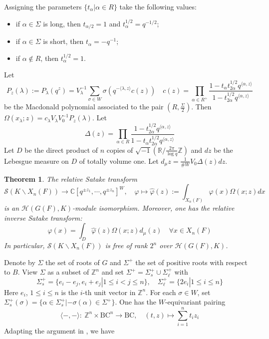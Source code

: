 \documentclass{amsart}
\newtheorem{theorem}{Theorem}[section]
\theoremstyle{definition}
\theoremstyle{remark}
\newcommand{\1}{\mathbf{1}}
\newcommand{\C}{\mathbb{C}}
\newcommand{\R}{\mathbb{R}}
\newcommand{\sh}[1]{\mathcal{#1}}
\theoremstyle{definition}
\newcommand{\BC}{\mathrm{BC}}
\newcommand{\CS}{{\mathcal {S}}}
\newcommand{\BZ}{{\mathbb {Z}}}
\begin{document}
 Assigning the parameters $\{t_\alpha| \alpha\in R\}$ take the following values:
\begin{itemize}
\item if $\alpha \in \Sigma$ is long, then $t_{\alpha/2}=1$ and $t_{\alpha}^{1/2}=q^{-1/2}$;
\item if $\alpha \in \Sigma$ is short, then $t_\alpha=-q^{-1}$;
\item if $\alpha\notin R$, then $t_\alpha^{1/2}=1$.
\end{itemize}
Let \[ P_z(\lambda):=P_\lambda(q^z)=V_\lambda^{-1}\sum_{\sigma\in W}\sigma(q^{-\langle \lambda,z\rangle}c(z))\quad c(z)=\prod_{\alpha\in R^+}\frac{1-t_\alpha t_{2\alpha}^{1/2} q^{\langle\alpha,z\rangle}}{1- t_{2\alpha}^{1/2} q^{\langle\alpha,z\rangle}}\] be the Macdonald polynomial associated to the pair $(R,\frac{\Sigma}{2})$. Then $\Omega(x_\lambda;z)=c_\lambda V_\lambda V_0^{-1} P_z(\lambda)$. Let \[\Delta(z)=\prod_{\alpha\in R}\frac{1-t_{2\alpha}^{1/2}q^{\langle \alpha,z\rangle}}{1-t_\alpha t_{2\alpha}^{1/2}q^{\langle \alpha,z\rangle}}\]
Let $D$ be the direct product of $n$ copies of $\sqrt{-1}(\R/\frac{2\pi}{\log q}\BZ)$ and $dz$ be the Lebesgue measure on $D$ of totally volume one. Let $d_\mu z=\frac{1}{\# W}V_0\Delta(z)dz$. 
\begin{theorem}\label{RSUFJ}The relative Satake transform 
\[ \CS(K\backslash X_n(F))\to \C[q^{\pm z_1},\cdots, q^{\pm z_n}]^W,\quad \varphi\mapsto \hat{\varphi}(z):=\int_{X_n(F)}\varphi(x)\Omega(x;z)dx\]
is an $\sh{H}(G(F),K)$-module isomorphism. Moreover, one has the relative inverse Satake transform: 
\[\varphi(x)=\int_D \hat{\varphi}(z)\Omega(x;z)d_\mu(z)\quad \forall x\in X_n(F)\]
In particular, $\CS(K\backslash X_n(F))$ is free of rank $2^n$ over $\mathcal{H}(G(F),K)$.
\end{theorem}







\iffalse

Denote by $\Sigma$ the set of roots of $G$ and $\Sigma^+$ the set of positive roots with respect to $B$. View $\Sigma$ as a subset of $\BZ^n$ and set 
$\Sigma^+=\Sigma_s^+\cup \Sigma_\ell^+$ with  \[\Sigma_s^+=\{e_i-e_j,e_i+e_j|1\leq i< j\leq n\},\quad \Sigma_\ell^+=\{2e_i| 1\leq i\leq n\}\]
Here $e_i$, $1\leq i\leq n$ is the $i$-th unit vector in $\BZ^n$. For each $\sigma\in W$, set  $\Sigma_s^+(\sigma)=\{\alpha\in\Sigma_s^+|-\sigma(\alpha)\in\Sigma^+\}$. One has the $W$-equivariant pairing \[\langle-,-\rangle:\ \BZ^n\times\BC^n\to\BC,\quad  (t,z)\mapsto\sum_{i=1}^nt_iz_i\] 
Adapting the argument in \cite[Thm 2.3]{HK14}, we have
\end{document}

